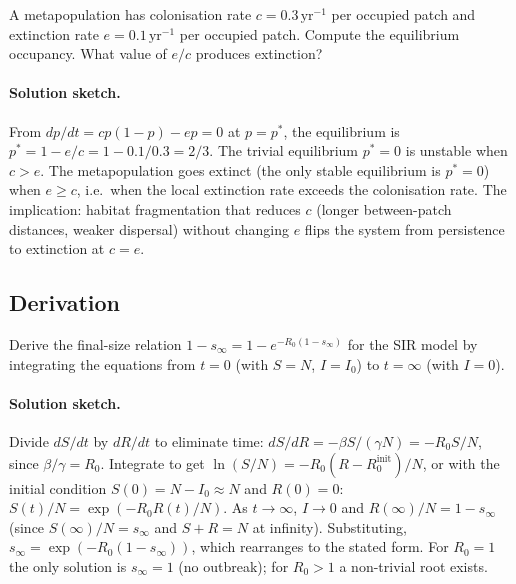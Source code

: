 \begin{exercise}
A metapopulation has colonisation rate $c = 0.3\,\text{yr}^{-1}$ per
occupied patch and extinction rate $e = 0.1\,\text{yr}^{-1}$ per
occupied patch. Compute the equilibrium occupancy. What value of
$e/c$ produces extinction?

\paragraph{Solution sketch.} From $dp/dt = cp(1-p) - ep = 0$ at
$p = p^*$, the equilibrium is $p^* = 1 - e/c = 1 - 0.1/0.3 = 2/3$.
The trivial equilibrium $p^* = 0$ is unstable when $c > e$. The
metapopulation goes extinct (the only stable equilibrium is
$p^* = 0$) when $e \geq c$, i.e.\ when the local extinction rate
exceeds the colonisation rate. The implication: habitat
fragmentation that reduces $c$ (longer between-patch distances,
weaker dispersal) without changing $e$ flips the system from
persistence to extinction at $c = e$.
\end{exercise}

\subsection*{Derivation}

\begin{exercise}
Derive the final-size relation $1 - s_\infty = 1 - e^{-R_0(1 -
s_\infty)}$ for the SIR model by integrating the equations from
$t = 0$ (with $S = N$, $I = I_0$) to $t = \infty$ (with $I = 0$).

\paragraph{Solution sketch.} Divide $dS/dt$ by $dR/dt$ to eliminate
time: $dS/dR = -\beta S/(\gamma N) = -R_0 S/N$, since $\beta/\gamma
= R_0$. Integrate to get $\ln(S/N) = -R_0 (R - R_0^{\mathrm{init}})/N$,
or with the initial condition $S(0) = N - I_0 \approx N$ and
$R(0) = 0$: $S(t)/N = \exp(-R_0 R(t)/N)$. As $t \to \infty$, $I \to
0$ and $R(\infty)/N = 1 - s_\infty$ (since $S(\infty)/N = s_\infty$
and $S + R = N$ at infinity). Substituting, $s_\infty =
\exp(-R_0(1 - s_\infty))$, which rearranges to the stated form.
For $R_0 = 1$ the only solution is $s_\infty = 1$ (no outbreak);
for $R_0 > 1$ a non-trivial root exists.
\end{exercise}

